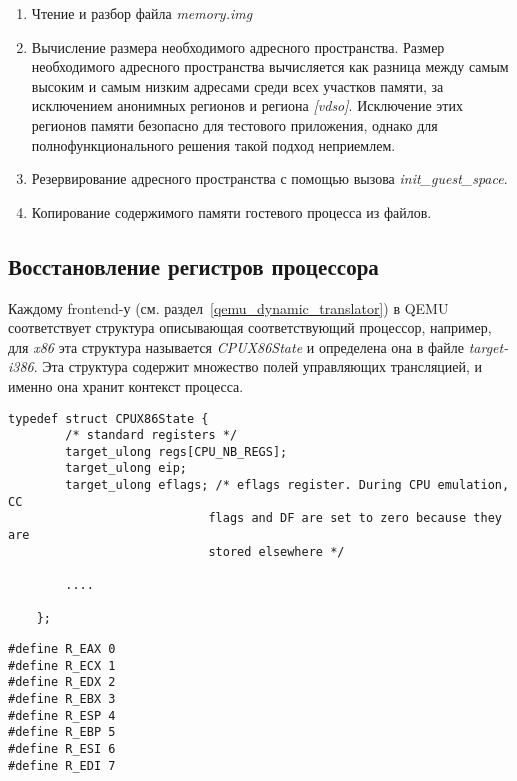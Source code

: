 \begin{enumerate}

    \item Чтение и разбор файла \textit{memory.img}
    \item Вычисление размера необходимого адресного пространства. Размер необходимого адресного пространства вычисляется как разница между самым высоким и самым низким адресами среди всех участков памяти, за исключением анонимных регионов и региона \textit{[vdso]}. Исключение этих регионов памяти безопасно для тестового приложения, однако для полнофункционального решения такой подход неприемлем.
    \item Резервирование адресного пространства с помощью вызова \textit{init\_guest\_space}.
    \item Копирование содержимого памяти гостевого процесса из файлов.

\end{enumerate}

\subsection{Восстановление регистров процессора}

Каждому frontend-у (см. раздел~\ref{qemu_dynamic_translator}) в QEMU соответствует структура описывающая соответствующий процессор, например, для \textit{x86} эта структура называется \textit{CPUX86State} и определена она в файле \textit{target-i386}. Эта структура содержит множество полей управляющих трансляцией, и именно она хранит контекст процесса.

\begin{lstlisting}[caption=Структура описывающая контекст, label=code:cpux86state]
    typedef struct CPUX86State {
        /* standard registers */
        target_ulong regs[CPU_NB_REGS];
        target_ulong eip;
        target_ulong eflags; /* eflags register. During CPU emulation, CC
                            flags and DF are set to zero because they are
                            stored elsewhere */

        ....        

    };
\end{lstlisting}


\begin{lstlisting}[caption=Индексы регистров x86\_32, label=code:regs_indexes]
#define R_EAX 0
#define R_ECX 1
#define R_EDX 2
#define R_EBX 3
#define R_ESP 4
#define R_EBP 5
#define R_ESI 6
#define R_EDI 7
\end{lstlisting}

